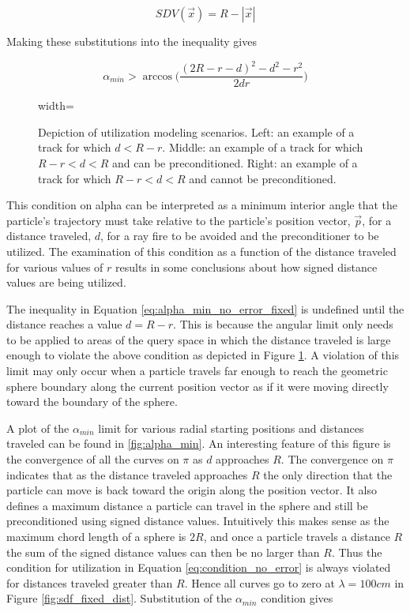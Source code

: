 \begin{equation}
  SDV(\vec{x}) =  R-|\vec{x}|
  \label{eq:sdf_sphere}
\end{equation}

Making these substitutions into the inequality gives

\begin{equation}
  \alpha_{min} > \arccos\Bigg ( \frac{(2R-r-d)^2-d^2-r^2}{2 d r} \Bigg )
  \label{eq:alpha_min_no_error_fixed}
\end{equation}

\begin{figure}[ht]
  \centering
  {width=\textwidth}
  \caption[Depiction of utilization modeling scenarios.]{Depiction of
    utilization modeling scenarios. Left: an example of a track for which $d < R
    - r$. Middle: an example of a track for which $R-r < d < R$ and can be
    preconditioned.  Right: an example of a track for which $R-r < d < R$ and
    cannot be preconditioned.}
  \label{fig:modeling_cases}
\end{figure}

This condition on alpha can be interpreted as a minimum interior angle that the
particle's trajectory must take relative to the particle's position vector,
$\vec{p}$, for a distance traveled, $d$, for a ray fire to be avoided and the
preconditioner to be utilized. The examination of this condition as a function
of the distance traveled for various values of $r$ results in some conclusions
about how signed distance values are being utilized.

The inequality in Equation \eqref{eq:alpha_min_no_error_fixed} is undefined until the distance reaches a value $d = R- r$. This
is because the angular limit only needs to be applied to areas of the query
space in which the distance traveled is large enough to violate the above
condition as depicted in  Figure \ref{fig:modeling_cases}. A violation of this
limit may only occur when a particle travels far enough to reach the geometric
sphere boundary along the current position vector as if it were moving directly
toward the boundary of the sphere.

A plot of the $\alpha_{min}$ limit for various radial starting positions and
distances traveled can be found in \ref{fig:alpha_min}. An interesting feature
of this figure is the convergence of all the curves on $\pi$ as $d$ approaches
$R$. The convergence on $\pi$ indicates that as the distance traveled approaches
$R$ the only direction that the particle can move is back toward the origin
along the position vector. It also defines a maximum distance a particle can
travel in the sphere and still be preconditioned using signed distance
values. Intuitively this makes sense as the maximum chord length of a sphere is
$2R$, and once a particle travels a distance $R$ the sum of the signed distance
values can then be no larger than $R$. Thus the condition for utilization in
Equation \eqref{eq:condition_no_error} is always violated for distances traveled greater
than $R$. Hence all curves go to zero at $\lambda
= 100 cm$ in Figure \ref{fig:sdf_fixed_dist}. Substitution of the $\alpha_{min}$
condition gives

